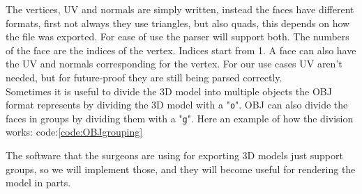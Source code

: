
\noindent
The vertices, UV and normals are simply written, instead the faces have different formats, first not always they use triangles, but also quads, this depends on how the file was exported.
For ease of use the parser will support both. The numbers of the face are the indices of the vertex. Indices start from 1.
A face can also have the UV and normals corresponding for the vertex. For our use cases UV aren't needed, but for future-proof they are still being parsed correctly.\\
Sometimes it is useful to divide the 3D model into multiple objects the OBJ format represents by dividing the 3D model with a "\texttt{o}".
OBJ can also divide the faces in groups by dividing them with a "\texttt{g}".
Here an example of how the division works: code:\ref{code:OBJgrouping}


\noindent
The software that the surgeons are using for exporting 3D models just support groups, so we will implement those, and they will become useful for rendering the model in parts.


